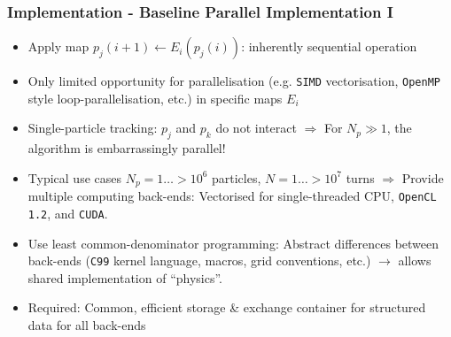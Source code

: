 \documentclass{beamer}
\begin{document}
\begin{frame}
\frametitle{Implementation - Baseline Parallel Implementation I}
\begin{itemize}
 \item Apply map $p_j\left(i+1\right) \gets E_i\left( p_j\left(i\right)\right)$: inherently sequential operation
 \item Only limited opportunity for parallelisation (e.g. \texttt{SIMD} vectorisation, \texttt{OpenMP} style loop-parallelisation, etc.) in specific maps $E_i$
 \item {\color{MyDarkBlue}Single-particle} tracking: $p_j$ and $p_k$ do not interact\newline
       $\Rightarrow$ For $N_p \gg 1$, the algorithm is embarrassingly parallel!
 \item Typical use cases $N_p = 1 \ldots >10^6$ particles, $N = 1 \ldots >10^7$ turns\newline
       $\Rightarrow$ Provide multiple {\color{MyDarkRed} computing back-ends}:\newline
       Vectorised for single-threaded CPU, \texttt{OpenCL 1.2}\cite{stone-opencl-2010}, and \texttt{CUDA}\cite{nickolls-cuda-2008}.
 \item Use {\color{MyDarkBlue} least common-denominator programming}:\newline
       Abstract differences between back-ends (\texttt{C99} kernel language, macros, grid conventions, etc.) $\rightarrow$ allows shared implementation of ``physics''.
 \item {\color{MyDarkRed}Required:} Common, efficient storage \& exchange container for structured data for all back-ends
\end{itemize}
\end{frame}
\end{document}
